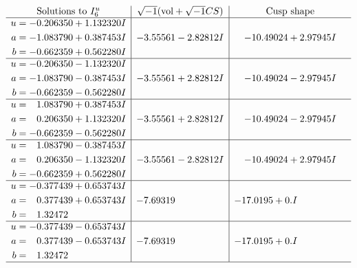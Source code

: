 \documentclass[1p]{elsarticle_modified}
\theoremstyle{definition}
\newcommand{\I}{\sqrt{-1}}
\begin{document}
$$\begin{array}{c|c|c}  
\text{Solutions to }I^u_{6}& \I (\text{vol} + \sqrt{-1}CS) & \text{Cusp shape}\\
 \hline 
\begin{aligned}
u &= -0.206350 + 1.132320 I \\
a &= -1.083790 + 0.387453 I \\
b &= -0.662359 + 0.562280 I\end{aligned}
 & -3.55561 - 2.82812 I & -10.49024 + 2.97945 I \\ \hline\begin{aligned}
u &= -0.206350 - 1.132320 I \\
a &= -1.083790 - 0.387453 I \\
b &= -0.662359 - 0.562280 I\end{aligned}
 & -3.55561 + 2.82812 I & -10.49024 - 2.97945 I \\ \hline\begin{aligned}
u &= \phantom{-}1.083790 + 0.387453 I \\
a &= \phantom{-}0.206350 + 1.132320 I \\
b &= -0.662359 - 0.562280 I\end{aligned}
 & -3.55561 + 2.82812 I & -10.49024 - 2.97945 I \\ \hline\begin{aligned}
u &= \phantom{-}1.083790 - 0.387453 I \\
a &= \phantom{-}0.206350 - 1.132320 I \\
b &= -0.662359 + 0.562280 I\end{aligned}
 & -3.55561 - 2.82812 I & -10.49024 + 2.97945 I \\ \hline\begin{aligned}
u &= -0.377439 + 0.653743 I \\
a &= \phantom{-}0.377439 + 0.653743 I \\
b &= \phantom{-}1.32472\phantom{ +0.000000I}\end{aligned}
 & -7.69319\phantom{ +0.000000I} & -17.0195 + 0. I\phantom{ +0.000000I} \\ \hline\begin{aligned}
u &= -0.377439 - 0.653743 I \\
a &= \phantom{-}0.377439 - 0.653743 I \\
b &= \phantom{-}1.32472\phantom{ +0.000000I}\end{aligned}
 & -7.69319\phantom{ +0.000000I} & -17.0195 + 0. I\phantom{ +0.000000I}\\
 \hline 
 \end{array}$$\newpage\newpage\renewcommand{\arraystretch}{1}
\end{document}
